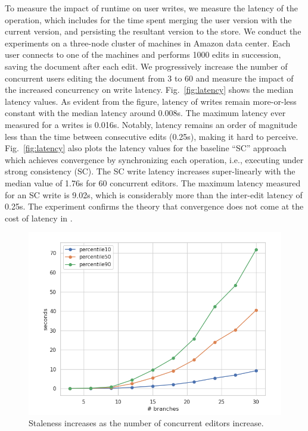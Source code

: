 To measure the impact of \quark runtime on user writes, we measure the
latency of the  operation, which includes for the time spent
merging the user version with the current version, and persisting the
resultant version to the store. We conduct the experiments on a
three-node cluster of  machines in Amazon 
data center. Each user connects to one of the machines and performs
1000 edits in succession, saving the document after each edit. We
progressively increase the number of concurrent users editing the
document from 3 to 60 and measure the impact of the increased
concurrency on write latency. Fig.~\ref{fig:latency} shows the median
latency values. As evident from the figure, latency of \quark writes
remain more-or-less constant with the median latency around 0.008s.
The maximum latency ever measured for a \quark writes is 0.016s.
Notably, latency remains an order of magnitude less than the time
between consecutive edits (0.25s), making it hard to perceive.
Fig.~\ref{fig:latency} also plots the latency values for the baseline
``SC'' approach which achieves convergence by synchronizing each
operation, i.e., executing under strong consistency (SC). The SC write
latency increases super-linearly with the median value of 1.76s for 60
concurrent editors. The maximum latency measured for an SC write is
9.02s, which is considerably more than the inter-edit latency of
0.25s. The experiment confirms the theory that convergence does not
come at the cost of latency in
\quark.

\begin{figure}[ht]
  \centering
    \includegraphics[scale=0.3]{Figures/staleness}
\caption{Staleness increases as the number of concurrent editors
  increase.}
\label{fig:staleness}
  \vspace*{-0.2in}
\end{figure}

